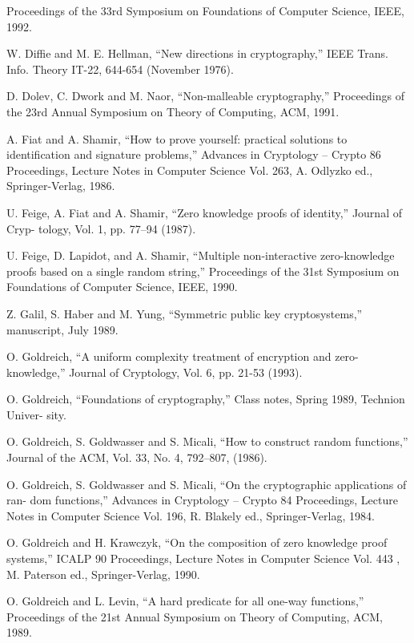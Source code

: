 \documentclass[]{article}
\begin{document}
    Proceedings of the 33rd Symposium on Foundations of Computer Science, IEEE, 1992.\par
    [12] W. Diffie and M. E. Hellman, “New directions in cryptography,” IEEE Trans. Info.
    Theory IT-22, 644-654 (November 1976).\par
    [13] D. Dolev, C. Dwork and M. Naor, “Non-malleable cryptography,” Proceedings of the
    23rd Annual Symposium on Theory of Computing, ACM, 1991.\par
    [14] A. Fiat and A. Shamir, “How to prove yourself: practical solutions to identification and
    signature problems,” Advances in Cryptology – Crypto 86 Proceedings, Lecture Notes in
    Computer Science Vol. 263, A. Odlyzko ed., Springer-Verlag, 1986.\par
    [15] U. Feige, A. Fiat and A. Shamir, “Zero knowledge proofs of identity,” Journal of Cryp-
    tology, Vol. 1, pp. 77–94 (1987).\par
    [16] U. Feige, D. Lapidot, and A. Shamir, “Multiple non-interactive zero-knowledge proofs
    based on a single random string,” Proceedings of the 31st Symposium on Foundations of
    Computer Science, IEEE, 1990.\par
    [17] Z. Galil, S. Haber and M. Yung, “Symmetric public key cryptosystems,” manuscript,
    July 1989.\par
    [18] O. Goldreich, “A uniform complexity treatment of encryption and zero-knowledge,” Journal
    of Cryptology, Vol. 6, pp. 21-53 (1993).\par
    [19] O. Goldreich, “Foundations of cryptography,” Class notes, Spring 1989, Technion Univer-
    sity.\par
    [20] O. Goldreich, S. Goldwasser and S. Micali, “How to construct random functions,”
    Journal of the ACM, Vol. 33, No. 4, 792–807, (1986).\par
    [21] O. Goldreich, S. Goldwasser and S. Micali, “On the cryptographic applications of ran-
    dom functions,” Advances in Cryptology – Crypto 84 Proceedings, Lecture Notes in Computer
    Science Vol. 196, R. Blakely ed., Springer-Verlag, 1984.\par
    [22] O. Goldreich and H. Krawczyk, “On the composition of zero knowledge proof systems,”
    ICALP 90 Proceedings, Lecture Notes in Computer Science Vol. 443 , M. Paterson ed.,
    Springer-Verlag, 1990.\par
    [23] O. Goldreich and L. Levin, “A hard predicate for all one-way functions,” Proceedings of
    the 21st Annual Symposium on Theory of Computing, ACM, 1989.\par
\end{document}
